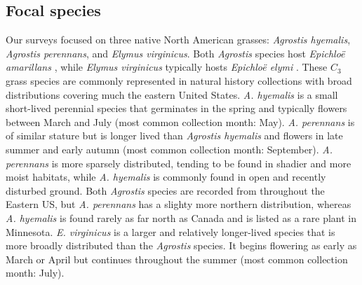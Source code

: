 \documentclass[11pt]{article}
\let\cite\citep
\begin{document}
        \subsection*{Focal species}
Our surveys focused on three native North American grasses: \emph{Agrostis hyemalis}, \emph{Agrostis perennans}, and \emph{Elymus virginicus}. 
Both \emph{Agrostis} species host \emph{Epichloë amarillans} \cite{craven2001multigene, leuchtmann2014nomenclatural}, while \emph{Elymus virginicus} typically hosts \emph{Epichloë elymi} \cite{clay2002evolutionary}.
These $C_3$ grass species are commonly represented in natural history collections with broad distributions covering much the eastern United States.
\emph{A. hyemalis} is a small short-lived perennial species that germinates in the spring and typically flowers between March and July (most common collection month: May).
\emph{A. perennans} is of similar stature but is longer lived than \emph{Agrostis hyemalis} and flowers in late summer and early autumn (most common collection month: September). 
\emph{A. perennans} is more sparsely distributed, tending to be found in shadier and more moist habitats, while \emph{A. hyemalis} is commonly found in open and recently disturbed ground. 
Both \emph{Agrostis} species are recorded from throughout the Eastern US, but \emph{A. perennans} has a slighty more northern distribution, whereas \emph{A. hyemalis} is found rarely as far north as Canada and is listed as a rare plant in Minnesota.
\emph{E. virginicus} is a larger and relatively longer-lived  species that is more broadly distributed than the \emph{Agrostis} species. 
It begins flowering as early as March or April but continues throughout the summer (most common collection month: July).
\end{document}
